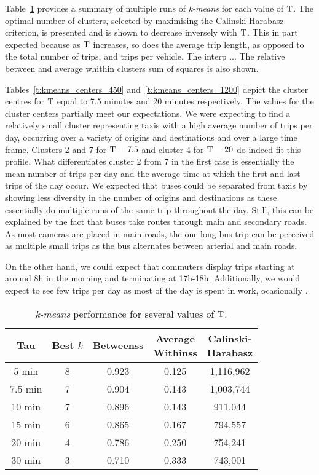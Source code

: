 Table~\ref{t:tau_comparison} provides a summary of multiple runs of \emph{k-means} for each value of $\mathrm{T}$. The optimal number of clusters, selected by maximising the Calinski-Harabasz criterion, is presented and is shown to decrease inversely with $\mathrm{T}$. This in part expected because as $\mathrm{T}$ increases, so does the average trip length, as opposed to the total number of trips, and trips per vehicle.  The interp   ... The relative between and average whithin clusters sum of squares is also shown.

Tables~\ref{t:kmeans_centers_450} and~\ref{t:kmeans_centers_1200} depict the cluster centres for $\mathrm{T}$ equal to 7.5 minutes and 20 minutes respectively. The values for the cluster centers partially meet our expectations. We were expecting to find a relatively small cluster representing taxis with a high average number of trips per day, occurring over a variety of origins and destinations and over a large time frame. Clusters 2 and 7 for $\mathrm{T} = 7.5$ and cluster 4 for $\mathrm{T} = 20$ do indeed fit this profile. What differentiates cluster 2 from 7 in the first case is essentially the mean number of trips per day and the average time at which the first and last trips of the day occur. We expected that buses could be separated from taxis by showing less diversity in the number of origins and destinations as these essentially do multiple runs of the same trip throughout the day. Still, this can be explained by the fact that buses take routes through main and secondary roads. As most cameras are placed in main roads, the one long bus trip can be perceived as multiple small trips as the bus alternates between arterial and main roads.

On the other hand, we could expect that commuters display trips starting at around 8h in the morning and terminating at 17h-18h. Additionally, we would expect to see few trips per day as most of the day is spent in work, ocasionally .

\begin{table}[t]
\centering
\tabcolsep=0.17cm
\begin{tabular}{c c c c c}
  \hline
Tau & Best $k$ & Betweenss & \thead{Average\\Withinss} & \thead{Calinski-\\Harabasz} \\
  \hline
5 min &   8 & 0.923 & 0.125 & 1,116,962 \\
  7.5 min &   7 & 0.904 & 0.143 & 1,003,744 \\
  10 min&   7 & 0.896 & 0.143 &   911,044 \\
  15 min &   6 & 0.865 & 0.167 &   794,557 \\
  20 min &   4 & 0.786 & 0.250 &   754,241 \\
  30 min &   3 & 0.710 & 0.333 &   743,001 \\
   \hline
\end{tabular}
\caption{\emph{k-means} performance for several values of $\mathrm{T}$.}
\label{t:tau_comparison}
\end{table}

